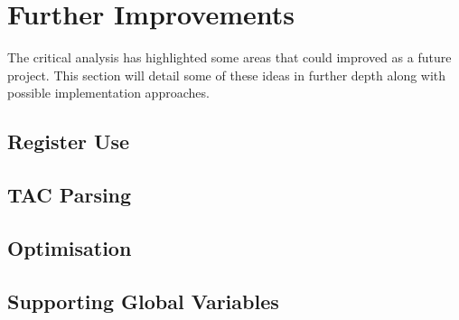 \chapter{Further Improvements}

The critical analysis has highlighted some areas that could improved as a future project. This section will detail some of these ideas in further depth along with possible implementation approaches.

\section{Register Use}
\section{TAC Parsing}
\section{Optimisation}
\section{Supporting Global Variables}